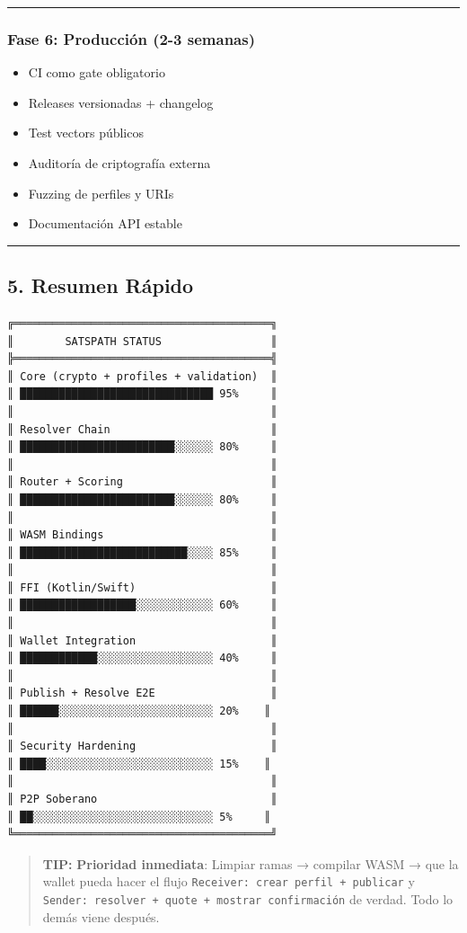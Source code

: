 \documentclass[
]{article}
\providecommand{\tightlist}{%
  \setlength{\itemsep}{0pt}\setlength{\parskip}{0pt}}
\begin{document}
\begin{center}\rule{0.5\linewidth}{0.5pt}\end{center}

\hypertarget{fase-6-producciuxf3n-2-3-semanas}{%
\subsubsection{Fase 6: Producción (2-3
semanas)}\label{fase-6-producciuxf3n-2-3-semanas}}

\begin{itemize}
\tightlist
\item[$\square$]
  CI como gate obligatorio
\item[$\square$]
  Releases versionadas + changelog
\item[$\square$]
  Test vectors públicos
\item[$\square$]
  Auditoría de criptografía externa
\item[$\square$]
  Fuzzing de perfiles y URIs
\item[$\square$]
  Documentación API estable
\end{itemize}

\begin{center}\rule{0.5\linewidth}{0.5pt}\end{center}

\hypertarget{resumen-ruxe1pido}{%
\subsection{5. Resumen Rápido}\label{resumen-ruxe1pido}}

\begin{verbatim}
╔════════════════════════════════════════╗
║        SATSPATH STATUS                 ║
╠════════════════════════════════════════╣
║ Core (crypto + profiles + validation)  ║
║ ██████████████████████████████ 95%     ║
║                                        ║
║ Resolver Chain                         ║
║ ████████████████████████░░░░░░ 80%     ║
║                                        ║
║ Router + Scoring                       ║
║ ████████████████████████░░░░░░ 80%     ║
║                                        ║
║ WASM Bindings                          ║
║ ██████████████████████████░░░░ 85%     ║
║                                        ║
║ FFI (Kotlin/Swift)                     ║
║ ██████████████████░░░░░░░░░░░░ 60%     ║
║                                        ║
║ Wallet Integration                     ║
║ ████████████░░░░░░░░░░░░░░░░░░ 40%     ║
║                                        ║
║ Publish + Resolve E2E                  ║
║ ██████░░░░░░░░░░░░░░░░░░░░░░░░ 20%    ║
║                                        ║
║ Security Hardening                     ║
║ ████░░░░░░░░░░░░░░░░░░░░░░░░░░ 15%    ║
║                                        ║
║ P2P Soberano                           ║
║ ██░░░░░░░░░░░░░░░░░░░░░░░░░░░░ 5%     ║
╚════════════════════════════════════════╝
\end{verbatim}

\begin{quote}
\textbf{TIP:} \textbf{Prioridad inmediata}: Limpiar ramas → compilar
WASM → que la wallet pueda hacer el flujo
\texttt{Receiver:\ crear\ perfil\ +\ publicar} y
\texttt{Sender:\ resolver\ +\ quote\ +\ mostrar\ confirmación} de
verdad. Todo lo demás viene después.
\end{quote}
\end{document}
